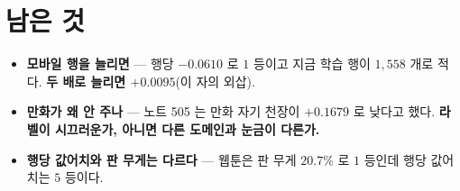 \documentclass[11pt]{article}
\begin{document}
\section*{남은 것}

\begin{itemize}
\item \textbf{모바일 행을 늘리면} --- 행당 $-0.0610$ 로 $1$ 등이고 지금
학습 행이 $1{,}558$ 개로 적다. \textbf{두 배로 늘리면 $+0.0095$}(이
자의 외삽).
\item \textbf{만화가 왜 안 주나} --- 노트 505 는 만화 자기 천장이
$+0.1679$ 로 낮다고 했다. \textbf{라벨이 시끄러운가, 아니면 다른
도메인과 눈금이 다른가.}
\item \textbf{행당 값어치와 판 무게는 다르다} --- 웹툰은 판 무게 $20.7\%$
로 $1$ 등인데 행당 값어치는 $5$ 등이다.
\end{itemize}
\end{document}
